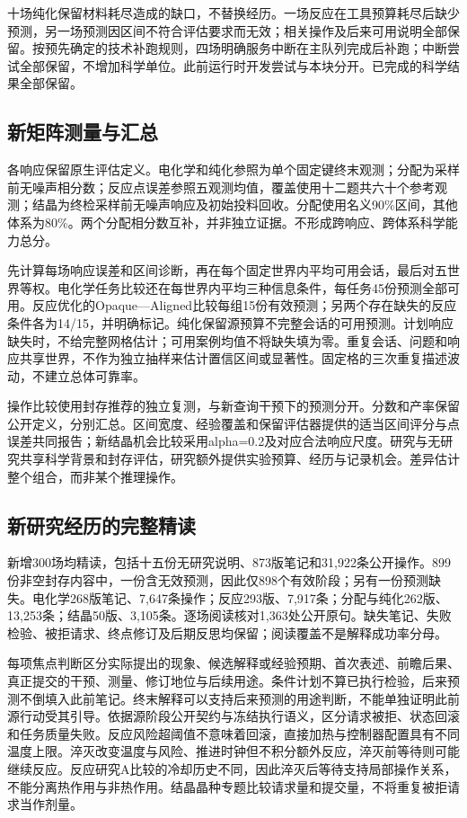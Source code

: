 \documentclass[10pt,a4paper]{article}
\begin{document}
十场纯化保留材料耗尽造成的缺口，不替换经历。一场反应在工具预算耗尽后缺少预测，另一场预测因区间不符合评估要求而无效；相关操作及后来可用说明全部保留。按预先确定的技术补跑规则，四场明确服务中断在主队列完成后补跑；中断尝试全部保留，不增加科学单位。此前运行时开发尝试与本块分开。已完成的科学结果全部保留。

\subsection{新矩阵测量与汇总}\label{ux65b0ux77e9ux9635ux6d4bux91cfux4e0eux6c47ux603b}

各响应保留原生评估定义。电化学和纯化参照为单个固定键终末观测；分配为采样前无噪声相分数；反应点误差参照五观测均值，覆盖使用十二题共六十个参考观测；结晶为终检采样前无噪声响应及初始投料回收。分配使用名义90\%区间，其他体系为80\%。两个分配相分数互补，并非独立证据。不形成跨响应、跨体系科学能力总分。

先计算每场响应误差和区间诊断，再在每个固定世界内平均可用会话，最后对五世界等权。电化学任务比较还在每世界内平均三种信息条件，每任务45份预测全部可用。反应优化的Opaque---Aligned比较每组15份有效预测；另两个存在缺失的反应条件各为14/15，并明确标记。纯化保留源预算不完整会话的可用预测。计划响应缺失时，不给完整网格估计；可用案例均值不将缺失填为零。重复会话、问题和响应共享世界，不作为独立抽样来估计置信区间或显著性。固定格的三次重复描述波动，不建立总体可靠率。

操作比较使用封存推荐的独立复测，与新查询干预下的预测分开。分数和产率保留公开定义，分别汇总。区间宽度、经验覆盖和保留评估器提供的适当区间评分与点误差共同报告；新结晶机会比较采用alpha=0.2及对应合法响应尺度。研究与无研究共享科学背景和封存评估，研究额外提供实验预算、经历与记录机会。差异估计整个组合，而非某个推理操作。

\subsection{新研究经历的完整精读}\label{ux65b0ux7814ux7a76ux7ecfux5386ux7684ux5b8cux6574ux7cbeux8bfb}

新增300场均精读，包括十五份无研究说明、873版笔记和31,922条公开操作。899份非空封存内容中，一份含无效预测，因此仅898个有效阶段；另有一份预测缺失。电化学268版笔记、7,647条操作；反应293版、7,917条；分配与纯化262版、13,253条；结晶50版、3,105条。逐场阅读核对1,363处公开原句。缺失笔记、失败检验、被拒请求、终点修订及后期反思均保留；阅读覆盖不是解释成功率分母。

每项焦点判断区分实际提出的现象、候选解释或经验预期、首次表述、前瞻后果、真正提交的干预、测量、修订地位与后续用途。条件计划不算已执行检验，后来预测不倒填入此前笔记。终末解释可以支持后来预测的用途判断，不能单独证明此前源行动受其引导。依据源阶段公开契约与冻结执行语义，区分请求被拒、状态回滚和任务质量失败。反应风险超阈值不意味着回滚，直接加热与控制器配置具有不同温度上限。淬灭改变温度与风险、推进时钟但不积分额外反应，淬灭前等待则可能继续反应。反应研究A比较的冷却历史不同，因此淬灭后等待支持局部操作关系，不能分离热作用与非热作用。结晶晶种专题比较请求量和提交量，不将重复被拒请求当作剂量。
\end{document}
